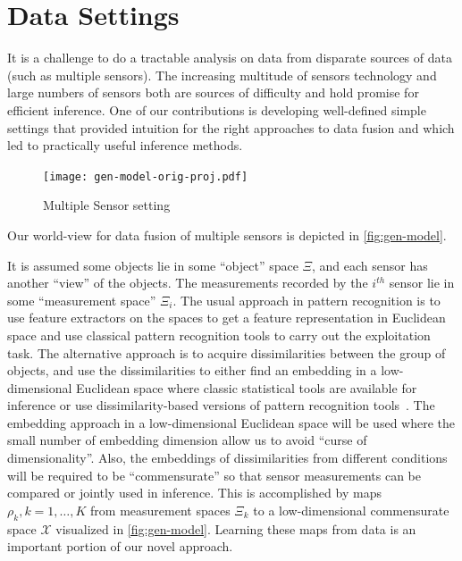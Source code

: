\documentclass[12pt,oneside,final]{thesis}\usepackage[]{graphicx}\usepackage[]{color}
\begin{document}
\section{Data Settings}


 It is a challenge  to do a tractable analysis on data from disparate sources of data (such as multiple sensors). The increasing multitude  of sensors technology and large numbers of sensors both are  sources of difficulty and hold promise for efficient inference. One of our contributions is developing well-defined simple settings that provided intuition for the right approaches to data fusion and which led to practically useful inference methods.
 
 
\begin{figure}
\centering
\texttt{[image: gen-model-orig-proj.pdf]}
\caption{Multiple Sensor setting \label{fig:gen-model}}
\end{figure}

 Our world-view for data fusion of multiple sensors is depicted in \autoref{fig:gen-model}.


It is assumed some objects lie in some ``object'' space $\Xi$, and each sensor has another ``view'' of the objects. The measurements recorded by the $i^{th}$ sensor lie in some ``measurement space'' $\Xi_i$. The usual approach in pattern recognition is to use feature extractors on the spaces to get a feature representation in Euclidean space and use classical pattern recognition tools to carry out the exploitation task. The alternative approach is to acquire dissimilarities between the group of objects, and use the dissimilarities to either find an embedding in a low-dimensional Euclidean space where classic statistical tools are available for inference or use dissimilarity-based versions of pattern recognition tools~\cite{duin2005dissimilarity}. The embedding approach in a  low-dimensional Euclidean space will be used where the small number of embedding dimension allow us to avoid ``curse of dimensionality''. Also, the embeddings of dissimilarities from  different conditions will be required to be ``commensurate'' so that sensor measurements can be compared or jointly used in inference. This is accomplished by maps $\rho_k,k=1,\ldots,K$ from measurement spaces $\Xi_k$ to a low-dimensional commensurate space $\mathcal{X}$ visualized in \autoref{fig:gen-model}. Learning these maps from data is  an important portion of our novel  approach.
\label{sec:data}
\end{document}
